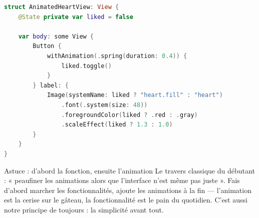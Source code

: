 \begin{lstlisting}[language=Swift]
struct AnimatedHeartView: View {
    @State private var liked = false

    var body: some View {
        Button {
            withAnimation(.spring(duration: 0.4)) {
                liked.toggle()
            }
        } label: {
            Image(systemName: liked ? "heart.fill" : "heart")
                .font(.system(size: 48))
                .foregroundColor(liked ? .red : .gray)
                .scaleEffect(liked ? 1.3 : 1.0)
        }
    }
}
\end{lstlisting}

\begin{tcbinfo}{Astuce : d'abord la fonction, ensuite l'animation}
Le travers classique du débutant : « peaufiner les animations alors que l'interface n'est même pas juste ». Fais d'abord marcher les fonctionnalités, ajoute les animations à la fin — l'animation est la cerise sur le gâteau, la fonctionnalité est le pain du quotidien. C'est aussi notre principe de toujours : la simplicité avant tout.

\end{tcbinfo}

